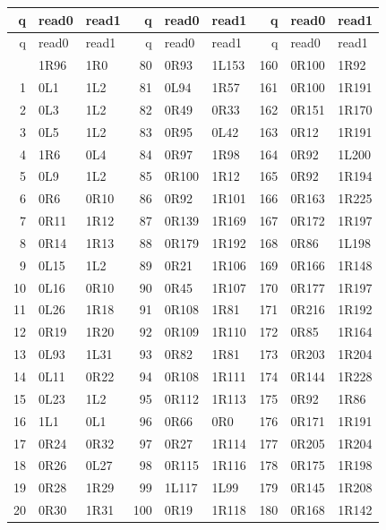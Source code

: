 \begingroup\small\ttfamily
\setlength{\tabcolsep}{5pt}
\begin{longtable}{rll@{\hspace{1.3em}}rll@{\hspace{1.3em}}rll}
\toprule
q & read0 & read1 & q & read0 & read1 & q & read0 & read1\\
\midrule\endfirsthead
\toprule
q & read0 & read1 & q & read0 & read1 & q & read0 & read1\\
\midrule\endhead
\bottomrule\endfoot
0 & 1R96 & 1R0 & 80 & 0R93 & 1L153 & 160 & 0R100 & 1R92\\
1 & 0L1 & 1L2 & 81 & 0L94 & 1R57 & 161 & 0R100 & 1R191\\
2 & 0L3 & 1L2 & 82 & 0R49 & 0R33 & 162 & 0R151 & 1R170\\
3 & 0L5 & 1L2 & 83 & 0R95 & 0L42 & 163 & 0R12 & 1R191\\
4 & 1R6 & 0L4 & 84 & 0R97 & 1R98 & 164 & 0R92 & 1L200\\
5 & 0L9 & 1L2 & 85 & 0R100 & 1R12 & 165 & 0R92 & 1R194\\
6 & 0R6 & 0R10 & 86 & 0R92 & 1R101 & 166 & 0R163 & 1R225\\
7 & 0R11 & 1R12 & 87 & 0R139 & 1R169 & 167 & 0R172 & 1R197\\
8 & 0R14 & 1R13 & 88 & 0R179 & 1R192 & 168 & 0R86 & 1L198\\
9 & 0L15 & 1L2 & 89 & 0R21 & 1R106 & 169 & 0R166 & 1R148\\
10 & 0L16 & 0R10 & 90 & 0R45 & 1R107 & 170 & 0R177 & 1R197\\
11 & 0L26 & 1R18 & 91 & 0R108 & 1R81 & 171 & 0R216 & 1R192\\
12 & 0R19 & 1R20 & 92 & 0R109 & 1R110 & 172 & 0R85 & 1R164\\
13 & 0L93 & 1L31 & 93 & 0R82 & 1R81 & 173 & 0R203 & 1R204\\
14 & 0L11 & 0R22 & 94 & 0R108 & 1R111 & 174 & 0R144 & 1R228\\
15 & 0L23 & 1L2 & 95 & 0R112 & 1R113 & 175 & 0R92 & 1R86\\
16 & 1L1 & 0L1 & 96 & 0R66 & 0R0 & 176 & 0R171 & 1R191\\
17 & 0R24 & 0R32 & 97 & 0R27 & 1R114 & 177 & 0R205 & 1R204\\
18 & 0R26 & 0L27 & 98 & 0R115 & 1R116 & 178 & 0R175 & 1R198\\
19 & 0R28 & 1R29 & 99 & 1L117 & 1L99 & 179 & 0R145 & 1R208\\
20 & 0R30 & 1R31 & 100 & 0R19 & 1R118 & 180 & 0R168 & 1R142\\

\end{longtable}
